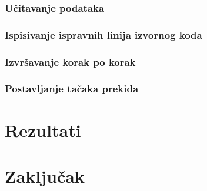 \documentclass[12pt,oneside]{memoir}
\begin{document}

\subsection{Učitavanje podataka}

\subsection{Ispisivanje ispravnih linija izvornog koda}

\subsection{Izvršavanje korak po korak}

\subsection{Postavljanje tačaka prekida}

\chapter{Rezultati}

\chapter{Zaključak}


\literatura

\backmatter
\end{document}
